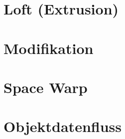 \section{Loft (Extrusion)}

\section{Modifikation}

\section{Space Warp}

\section{Objektdatenfluss}














